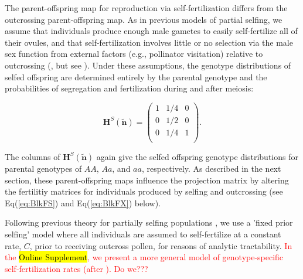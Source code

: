 \documentclass[11pt,draft]{article}
\def\mbf#1{\mathbf{#1}}
\begin{document}
The parent-offspring map for reproduction via self-fertilization differs from the outcrossing parent-offspring map. As in previous models of partial selfing, we assume that individuals produce enough male gametes to easily self-fertilize all of their ovules, and that self-fertilization involves little or no selection via the male sex function from external factors (e.g., pollinator visitation) relative to outcrossing (\citealt{Charlesworth1978a,JordanConnallon2014,Olito2017}, but see \citealt{Tazzyman2015}). Under these assumptions, the genotype distributions of selfed offspring are determined entirely by the parental genotype and the probabilities of segregation and fertilization during and after meiosis: 
\begin{linenomath*}
\begin{equation} \label{eq:HS}
	\mbf{H}^S(\tilde{\mbf{n}}) = 
			\left(
			\begin{array}{ccc}
				1 & 1/4 & 0 \\
				0 & 1/2 & 0 \\
				0 & 1/4 & 1 \\
			\end{array} \right).
\end{equation}
\end{linenomath*}
\noindent The columns of $\mbf{H}^S(\tilde{\mbf{n}})$ again give the selfed offspring genotype distributions for parental genotypes of $AA$, $Aa$, and $aa$, respectively. As described in the next section, these parent-offspring maps influence the projection matrix by altering the fertilitiy matrices for individuals produced by selfing and outcrossing (see Eq(\ref{eq:BlkFS}) and Eq(\ref{eq:BlkFX}) below).

Following previous theory for partially selfing populations \cite[e.g.,][]{Charlesworth2010,JordanConnallon2014,Glemin2021}, we use a 'fixed prior selfing' model where all individuals are assumed to self-fertilize at a constant rate, $C$, prior to receiving outcross pollen, for reasons of analytic tractability. \textcolor{red}{In the \hl{Online Supplement}, we present a more general model of genotype-specific self-fertilization rates (after \citealt{JordanConnallon2014}). Do we???}

\end{document}
